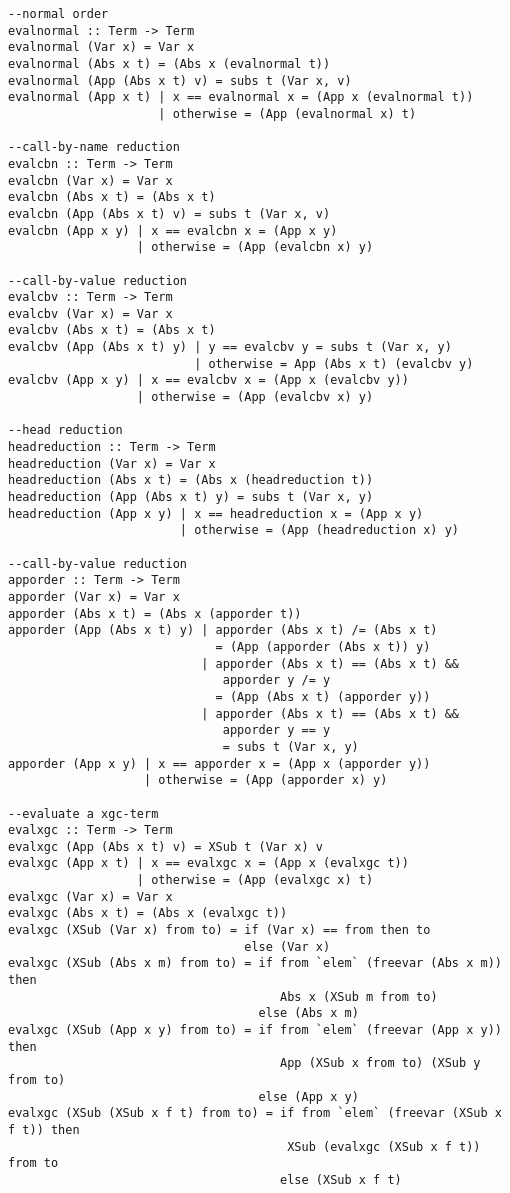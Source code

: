 \begin{verbatim}
--normal order
evalnormal :: Term -> Term
evalnormal (Var x) = Var x
evalnormal (Abs x t) = (Abs x (evalnormal t))
evalnormal (App (Abs x t) v) = subs t (Var x, v)
evalnormal (App x t) | x == evalnormal x = (App x (evalnormal t))
                     | otherwise = (App (evalnormal x) t)

--call-by-name reduction
evalcbn :: Term -> Term
evalcbn (Var x) = Var x
evalcbn (Abs x t) = (Abs x t)
evalcbn (App (Abs x t) v) = subs t (Var x, v)
evalcbn (App x y) | x == evalcbn x = (App x y)
                  | otherwise = (App (evalcbn x) y)

--call-by-value reduction
evalcbv :: Term -> Term
evalcbv (Var x) = Var x
evalcbv (Abs x t) = (Abs x t)
evalcbv (App (Abs x t) y) | y == evalcbv y = subs t (Var x, y)
                          | otherwise = App (Abs x t) (evalcbv y)
evalcbv (App x y) | x == evalcbv x = (App x (evalcbv y))
                  | otherwise = (App (evalcbv x) y)

--head reduction
headreduction :: Term -> Term
headreduction (Var x) = Var x
headreduction (Abs x t) = (Abs x (headreduction t))
headreduction (App (Abs x t) y) = subs t (Var x, y)
headreduction (App x y) | x == headreduction x = (App x y)
                        | otherwise = (App (headreduction x) y)

--call-by-value reduction
apporder :: Term -> Term
apporder (Var x) = Var x
apporder (Abs x t) = (Abs x (apporder t))
apporder (App (Abs x t) y) | apporder (Abs x t) /= (Abs x t) 
                             = (App (apporder (Abs x t)) y)
                           | apporder (Abs x t) == (Abs x t) && 
                              apporder y /= y 
                             = (App (Abs x t) (apporder y))
                           | apporder (Abs x t) == (Abs x t) && 
                              apporder y == y 
                              = subs t (Var x, y)
apporder (App x y) | x == apporder x = (App x (apporder y))
                   | otherwise = (App (apporder x) y)

--evaluate a xgc-term
evalxgc :: Term -> Term
evalxgc (App (Abs x t) v) = XSub t (Var x) v
evalxgc (App x t) | x == evalxgc x = (App x (evalxgc t))
                  | otherwise = (App (evalxgc x) t)
evalxgc (Var x) = Var x
evalxgc (Abs x t) = (Abs x (evalxgc t))
evalxgc (XSub (Var x) from to) = if (Var x) == from then to
                                 else (Var x)
evalxgc (XSub (Abs x m) from to) = if from `elem` (freevar (Abs x m)) then 
                                      Abs x (XSub m from to)
                                   else (Abs x m)
evalxgc (XSub (App x y) from to) = if from `elem` (freevar (App x y)) then 
                                      App (XSub x from to) (XSub y from to)
                                   else (App x y)
evalxgc (XSub (XSub x f t) from to) = if from `elem` (freevar (XSub x f t)) then 
                                       XSub (evalxgc (XSub x f t)) from to
                                      else (XSub x f t)



\end{verbatim}
